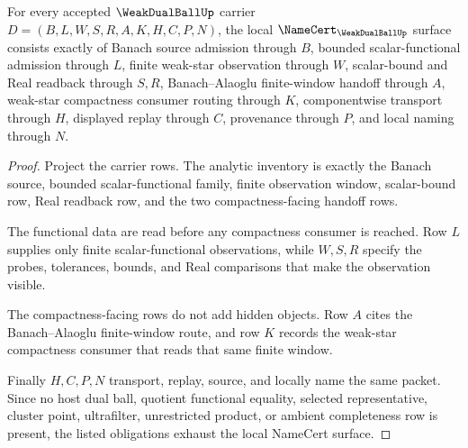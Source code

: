 \begin{theorem}
\label{thm:weak-dual-ball-namecert-obligations}
For every accepted $\WeakDualBallUp$ carrier $D=(B,L,W,S,R,A,K,H,C,P,N)$, the local $\NameCert_{\WeakDualBallUp}$ surface consists exactly of Banach source admission through $B$, bounded scalar-functional admission through $L$, finite weak-star observation through $W$, scalar-bound and Real readback through $S,R$, Banach--Alaoglu finite-window handoff through $A$, weak-star compactness consumer routing through $K$, componentwise transport through $H$, displayed replay through $C$, provenance through $P$, and local naming through $N$.
\end{theorem}
\begin{proof}
Project the carrier rows. The analytic inventory is exactly the Banach source, bounded scalar-functional family, finite observation window, scalar-bound row, Real readback row, and the two compactness-facing handoff rows.

The functional data are read before any compactness consumer is reached. Row $L$ supplies only finite scalar-functional observations, while $W,S,R$ specify the probes, tolerances, bounds, and Real comparisons that make the observation visible.

The compactness-facing rows do not add hidden objects. Row $A$ cites the Banach--Alaoglu finite-window route, and row $K$ records the weak-star compactness consumer that reads that same finite window.

Finally $H,C,P,N$ transport, replay, source, and locally name the same packet. Since no host dual ball, quotient functional equality, selected representative, cluster point, ultrafilter, unrestricted product, or ambient completeness row is present, the listed obligations exhaust the local NameCert surface.
\end{proof}

